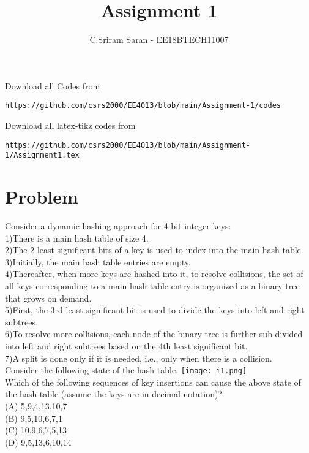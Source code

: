 \documentclass[journal,12pt,twocolumn]{IEEEtran}
\begin{document}
     \def\rightbox#1{\makebox[0in][r]{#1}}
     \def\centbox#1{\makebox[0in]{#1}}
     \def\topbox#1{\raisebox{-\baselineskip}[0in][0in]{#1}}
     \def\midbox#1{\raisebox{-0.5\baselineskip}[0in][0in]{#1}}
\vspace{3cm}
\title{Assignment 1}
\author{C.Sriram Saran - EE18BTECH11007}
\maketitle
\newpage
\bigskip
\renewcommand{\thefigure}{\theenumi}
\renewcommand{\thetable}{\theenumi}
Download all Codes from 
%
\begin{lstlisting}
https://github.com/csrs2000/EE4013/blob/main/Assignment-1/codes
\end{lstlisting}
Download all latex-tikz codes from 
\begin{lstlisting}
https://github.com/csrs2000/EE4013/blob/main/Assignment-1/Assignment1.tex
\end{lstlisting}
\section{Problem}
Consider a dynamic hashing approach for 4-bit integer keys:\\
1)There is a main hash table of size 4.\\
2)The 2 least significant bits of a key is used to index into the main hash table.\\
3)Initially, the main hash table entries are empty.\\
4)Thereafter, when more keys are hashed into it, to resolve collisions, the set of all keys corresponding to a main hash table entry is organized as a binary tree that grows on demand.\\
5)First, the 3rd least significant bit is used to divide the keys into left and right subtrees.\\
6)To resolve more collisions, each node of the binary tree is further sub-divided into left and right subtrees based on the 4th least significant bit.\\
7)A split is done only if it is needed, i.e., only when there is a collision.\\
Consider the following state of the hash table.
\texttt{[image: i1.png]}\\
Which of the following sequences of key insertions can cause the above state of the hash table (assume the keys are in decimal notation)?\\
(A) 5,9,4,13,10,7\\
(B) 9,5,10,6,7,1\\
(C) 10,9,6,7,5,13\\
(D) 9,5,13,6,10,14
\end{document}
